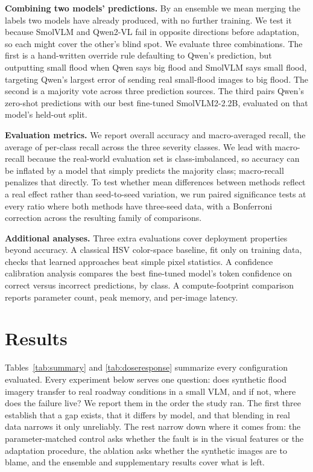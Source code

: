 \documentclass[conference]{IEEEtran}
\begin{document}
\textbf{Combining two models' predictions.} By an ensemble we mean merging the labels two models have already produced, with no further training. We test it because SmolVLM and Qwen2-VL fail in opposite directions before adaptation, so each might cover the other's blind spot. We evaluate three combinations. The first is a hand-written override rule defaulting to Qwen's prediction, but outputting small flood when Qwen says big flood and SmolVLM says small flood, targeting Qwen's largest error of sending real small-flood images to big flood. The second is a majority vote across three prediction sources. The third pairs Qwen's zero-shot predictions with our best fine-tuned SmolVLM2-2.2B, evaluated on that model's held-out split.

\textbf{Evaluation metrics.} We report overall accuracy and macro-averaged recall, the average of per-class recall across the three severity classes. We lead with macro-recall because the real-world evaluation set is class-imbalanced, so accuracy can be inflated by a model that simply predicts the majority class; macro-recall penalizes that directly. To test whether mean differences between methods reflect a real effect rather than seed-to-seed variation, we run paired significance tests at every ratio where both methods have three-seed data, with a Bonferroni correction across the resulting family of comparisons.

\textbf{Additional analyses.} Three extra evaluations cover deployment properties beyond accuracy. A classical HSV color-space baseline, fit only on training data, checks that learned approaches beat simple pixel statistics. A confidence calibration analysis compares the best fine-tuned model's token confidence on correct versus incorrect predictions, by class. A compute-footprint comparison reports parameter count, peak memory, and per-image latency.

\section{Results}

Tables~\ref{tab:summary} and \ref{tab:doseresponse} summarize every configuration evaluated. Every experiment below serves one question: does synthetic flood imagery transfer to real roadway conditions in a small VLM, and if not, where does the failure live? We report them in the order the study ran. The first three establish that a gap exists, that it differs by model, and that blending in real data narrows it only unreliably. The rest narrow down where it comes from: the parameter-matched control asks whether the fault is in the visual features or the adaptation procedure, the ablation asks whether the synthetic images are to blame, and the ensemble and supplementary results cover what is left.
\end{document}
